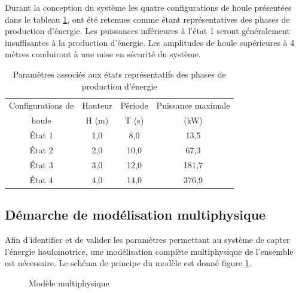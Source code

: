  
Durant la conception du système les quatre configurations de houle présentées dans le tableau \ref{tab01}, ont été retenues comme étant représentatives des phases de production d'énergie. Les puissances inférieures à l'état 1 seront généralement insuffisantes à la production d'énergie. Les amplitudes de houle supérieures à 4 mètres conduiront à une mise en sécurité du système.

\begin{table}
\begin{center}
\begin{tabular}{|c|c|c|c|}
\hline
Configurations de & Hauteur & Période & Puissance maximale\\
houle & H (m) & T (s) & (kW)\\
\hline
État 1 & 1,0 & 8,0 & 13,5 \\
\hline
État 2 & 2,0 & 10,0 & 67,3 \\
\hline
État 3 & 3,0 & 12,0 & 181,7 \\
\hline
État 4 & 4,0 & 14,0 & 376,9 \\
\hline
\end{tabular}
\end{center}
  \caption{Paramètres associés aux états représentatifs des phases de production d'énergie}
\label{tab01}
\end{table}

\subsection{Démarche de modélisation multiphysique}

Afin d'identifier et de valider les paramètres permettant au système de capter l'énergie houlomotrice, une modélisation complète multiphysique de l'ensemble est nécessaire. Le schéma de principe du modèle est donné figure \ref{fig08}.

\begin{figure}[ht!]
\begin{center}
  \def\svgwidth{0.95\linewidth}
  
 \end{center}
  \caption{Modèle multiphysique}
\label{fig08}
\end{figure}

